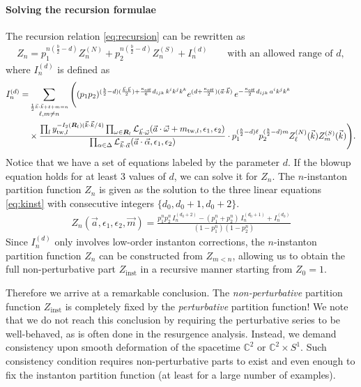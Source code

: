 \documentclass[letterpaper, 11pt]{article}
\newcommand{\nn}{\nonumber}
\def\IC{\mathbb{C}}
\def\CL{{\cal L}}
\def\a{\alpha}
\def\e{\epsilon}
\def\k{\kappa}
\def\w{\omega}
\def\D{\Delta}
\begin{document}
\paragraph{Solving the recursion formulae}
The recursion relation \eqref{eq:recursion} can be rewritten as 
\begin{align}
  \label{eq:kinst}
  Z_n = p_1^{n(\frac{b}{2}-d)}Z^{(N)}_{n}  + p_2^{n(\frac{b}{2}-d)}  Z^{(S)}_n  + I_n^{(d)} \qquad \text{with an allowed range of $d$},
\end{align}
where $I_{n}^{(d)}$ is defined as
\begin{align} \label{eq:Ind}
  I_{n}^{(d)} = &\sum_{\stackrel{\frac{1}{2}\vec{k}\cdot\vec{k} + \ell + m = n}{\ell, m \neq n}}  
  \Bigg( (p_1p_2)^{(\frac{b}{2} -d) (\frac{\vec{k}\cdot\vec{k}}{2}) +\frac{\k_\text{eff}}{6}d_{ijk}\,k^ik^jk^k} e^{(d+\frac{\k_\text{eff}}{2})(\vec{a}\cdot\vec{k})}\,
 e^{-\frac{\k_\text{eff}}{2}d_{ijk}\,a^ik^jk^k}  \\& 
 \times    \frac{\prod_{l} y_{\text{tw}, l}^{-I_2(\boldsymbol{R}_l)(\vec{k}\cdot\vec{k}/4)} \prod_{\w \in \boldsymbol{R}_l} \CL_{\vec{k}\cdot\vec{\w}}(\vec{a}\cdot \vec{\w} + m_{\text{tw},l}, \e_1,\e_2)}{ \prod_{\a \in \D} \CL_{\vec{k} \cdot \vec{\a}} (\vec{a}\cdot\vec{\alpha}, \epsilon_1, \epsilon_2)}
 \cdot p_1^{(\frac{b}{2}-d)\ell}p_2^{(\frac{b}{2}-d)m} Z^{(N)}_{\ell}(\vec{k})  Z^{(S)}_m (\vec{k}) \Bigg) . \nn
\end{align}
Notice that we have a set of equations labeled by the parameter $d$. If the blowup equation holds for at least 3 values of $d$, we can solve it for $Z_n$. 
The $n$-instanton partition function $Z_n$ is given as the solution to the three linear equations \eqref{eq:kinst} with consecutive integers $\{d_0, d_0+1, d_0+2\}$.
\begin{align}
  Z_n(\vec{a},\e_1,\e_2, \vec{m})=\frac{p_1^n p_2^n \,I_{n}^{(d_0+2)}-(p_1^n+p_2^n)\,I_{n}^{(d_0+1)}+I_{n}^{(d_0)}}{(1-p_1^n)(1-p_2^n)}
\end{align}
Since $I_n^{(d)}$ only involves low-order instanton corrections, the $n$-instanton partition function $Z_n$ can be constructed from $Z_{m<n}$, allowing us to obtain the full non-perturbative part $Z_\text{inst}$ in a recursive manner starting from $Z_0 = 1$. 

Therefore we arrive at a remarkable conclusion. The \emph{non-perturbative} partition function $Z_\text{inst}$ is completely fixed by the \emph{perturbative} partition function! We note that we do not reach this conclusion by requiring the perturbative series to be well-behaved, as is often done in the resurgence analysis. Instead, we demand consistency upon smooth deformation of the spacetime $\IC^2$ or $\IC^2 \times S^1$. Such consistency condition requires non-perturbative parts to exist and even enough to fix the instanton partition function (at least for a large number of examples). 
\end{document}
